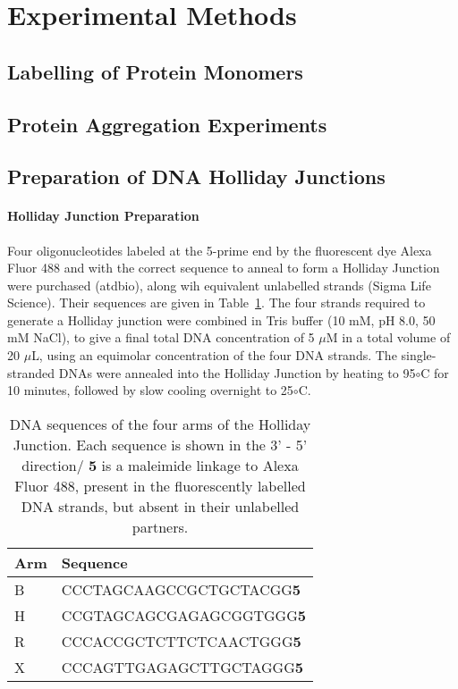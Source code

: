 \section{Experimental Methods}
\subsection{Labelling of Protein Monomers}
\subsection{Protein Aggregation Experiments}
\subsection{Preparation of DNA Holliday Junctions}
\paragraph{Holliday Junction Preparation}
Four oligonucleotides labeled at the 5-prime end by the fluorescent dye Alexa Fluor 488 and with the correct sequence to anneal to form a Holliday Junction were purchased (atdbio), along wih equivalent unlabelled strands (Sigma Life Science). Their sequences are given in Table~\ref{tab:table1_DNAsequences}. The four strands required to generate a Holliday junction were combined in Tris buffer (10 mM, pH 8.0, 50 mM NaCl), to give a final total DNA concentration of 5 $\mu$M in a total volume of 20 $\mu$L, using an equimolar concentration of the four DNA strands. The single-stranded DNAs were annealed into the Holliday Junction by heating to 95$\circ$C for 10 minutes, followed by slow cooling overnight to 25$\circ$C.

\begin{center}
\begin{table}[!ht]
\begin{tabular}{|l|l|}
\hline
{\bf Arm} & {\bf Sequence}\\ \hline
B & CCCTAGCAAGCCGCTGCTACGG{\bf 5} \\
H & CCGTAGCAGCGAGAGCGGTGGG{\bf 5} \\
R & CCCACCGCTCTTCTCAACTGGG{\bf 5} \\
X & CCCAGTTGAGAGCTTGCTAGGG{\bf 5} \\ \hline
\end{tabular}
\caption{DNA sequences of the four arms of the Holliday Junction. Each sequence is shown in the 3' - 5' direction/ {\bf 5} is a maleimide linkage to Alexa Fluor 488, present in the fluorescently labelled DNA strands, but absent in their unlabelled partners.}
\label{tab:table1_DNAsequences}
\end{table}
\end{center}



